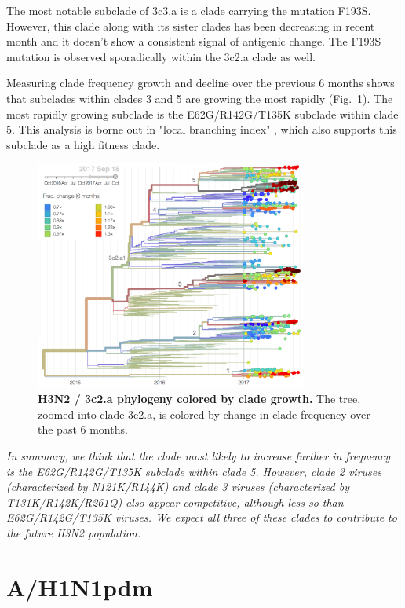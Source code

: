 \documentclass[11pt,oneside,letterpaper]{article}
\newcommand{\FIG}[1]{Fig.~\ref{#1}}
\begin{document}
The most notable subclade of 3c3.a is a clade carrying the mutation
F193S. However, this clade along with its sister clades has been
decreasing in recent month and it doesn't show a consistent signal of
antigenic change. The F193S mutation is observed sporadically within
the 3c2.a clade as well.

Measuring clade frequency growth and decline over the previous 6 months shows that subclades within clades 3 and 5 are growing the most rapidly (\FIG{h3n2_tree_dfreq}).
The most rapidly growing subclade is the E62G/R142G/T135K subclade within clade 5.
This analysis is borne out in "local branching index" \cite{neher2014predicting}, which also supports this subclade as a high fitness clade.

\begin{figure}[h!]
  \centering
  \includegraphics[width=0.8\textwidth]{../figures/sep-2017/h3n2_tree_dfreq.png}
	\caption{\textbf{H3N2 / 3c2.a phylogeny colored by clade growth.}
  The tree, zoomed into clade 3c2.a, is colored by change in clade frequency over the past 6 months.
  }
  \label{h3n2_tree_dfreq}
\end{figure}

\textit{In summary, we think that the clade most likely to increase further in frequency is the E62G/R142G/T135K subclade within clade 5.
However, clade 2 viruses (characterized by N121K/R144K) and clade 3 viruses (characterized by T131K/R142K/R261Q) also appear competitive, although less so than E62G/R142G/T135K viruses.
We expect all three of these clades to contribute to the future H3N2 population.}


\clearpage
\section*{A/H1N1pdm}
\end{document}
